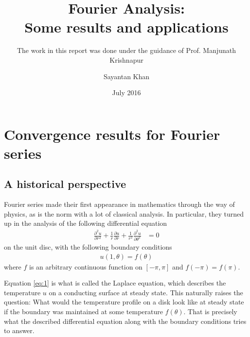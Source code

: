 \documentclass[12pt, titlepage]{article}
\title{Fourier Analysis: \\ Some results and applications}
\subtitle{The work in this report was done under the guidance of Prof. Manjunath Krishnapur}
\author{Sayantan Khan}
\date{July 2016}
\theoremstyle{definition}
\begin{document}
\maketitle

\tableofcontents

\newpage

\section{Convergence results for Fourier series}

\subsection{A historical perspective}
Fourier series made their first appearance in mathematics through the way of physics, as is the norm with a lot of classical analysis. In particular, they turned up in the analysis of the following differential equation
\begin{align}
    \frac{\partial^2 u}{\partial r^2} + \frac{1}{r} \frac{\partial u}{\partial r} + \frac{1}{r^2} \frac{\partial^2 u}{\partial \theta^2} &= 0 \label{eq:1}
\end{align}
on the unit disc, with the following boundary conditions
\begin{align*}
    u(1, \theta) = f(\theta)
\end{align*}
where $f$ is an arbitrary continuous function on $[-\pi, \pi]$ and $f(-\pi) = f(\pi)$.

Equation \ref{eq:1} is what is called the Laplace equation, which describes the temperature $u$ on a conducting surface at steady state. This naturally raises the question: What would the temperature profile on a disk look like at steady state if the boundary was maintained at some temperature $f(\theta)$. That is precisely what the described differential equation along with the boundary conditions tries to answer.
\end{document}
